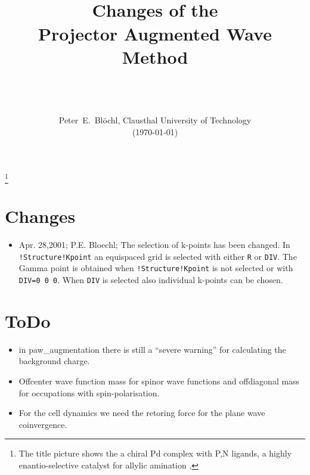 \documentclass[final,12pt]{article}
\title{{\bfseries\Huge 
    \hrulefill\\
    \hrulefill Changes of the \hrulefill\\
    \hrulefill \hrulefill Projector Augmented Wave \hrulefill\\
    \hrulefill Method \hrulefill\\}
    \medskip{\LARGE Version 2.0}\\
\resizebox{!}{9.0cm}{\texttt{[image: big.eps]}}
}
\date{\hrulefill\\Peter~E.~Bl\"ochl, Clausthal University of Technology\\(\today)}
\begin{document}
          
\maketitle   
%
\noindent            
\setcounter{page}{1}
\footnote{The title picture shows the a chiral Pd complex with P,N ligands,
  a highly enantio-selective catalyst for allylic amination \cite{Pdcat}.}
\newpage
\tableofcontents
\newpage
\setcounter{page}{1}
\section{Changes}
\begin{itemize}
\item Apr. 28,2001; P.E. Bloechl; The selection of k-points has been
changed.  In \texttt{!Structure!Kpoint} an equispaced grid is selected
with either \texttt{R} or \texttt{DIV}. The Gamma point is obtained
when \texttt{!Structure!Kpoint} is not selected or with \texttt{DIV=0 0
0}. When \texttt{DIV} is selected also individual k-points can be
chosen.
\end{itemize}
\section{ToDo}
\begin{itemize}
\item in paw\_augmentation there is still a ``severe warning'' for
calculating the background charge. 
\item Offcenter wave function mass for spinor wave functions and
offdiagonal mass for occupations with spin-polarisation.
\item For the cell dynamics we need the retoring force for the plane
wave coinvergence.
\end{itemize}
\end{document}
